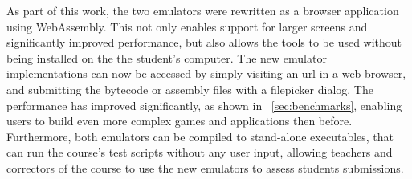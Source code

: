 As part of this work, the two emulators were rewritten as a browser application using WebAssembly. This not only enables support for larger screens and significantly improved performance, but also allows the tools to be used without being installed on the the student's computer.
The new emulator implementations can now be accessed by simply visiting an url in a web browser, and submitting the bytecode or assembly files with a filepicker dialog. The performance has improved significantly, as shown in ~\cref{sec:benchmarks}, enabling users to build even more complex games and applications then before.
Furthermore, both emulators can be compiled to stand-alone executables, that can run the course's test scripts without any user input, allowing teachers and correctors of the course to use the new emulators to assess students submissions.

